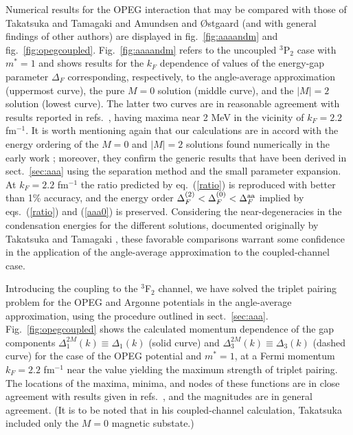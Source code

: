 Numerical results for the OPEG interaction that may be compared with 
those of Takatsuka and Tamagaki and Amundsen and {\O}stgaard (and with 
general findings of other authors) are displayed in fig.~\ref{fig:aaaandm}
and fig.~\ref{fig:opegcoupled}.  Fig.~\ref{fig:aaaandm} refers to 
the uncoupled $^3$P$_2$ case with $m^*=1$ and shows results for the 
$k_F$ dependence of values of the energy-gap parameter $\Delta_F$ 
corresponding, respectively, to the angle-average approximation (uppermost 
curve), the pure $M=0$ solution (middle curve), and the $|M|=2$ solution 
(lowest curve).  The latter two curves are in reasonable agreement with 
results reported in refs.~\cite{ttr,tt71,ostgaard}, having maxima near 
2 MeV in the vicinity of $k_F = 2.2$ fm$^{-1}$.  It is worth mentioning 
again that our calculations are in accord with the energy ordering of the 
$M=0$ and $|M|=2$ solutions found numerically in the early work 
\cite{tt71,ttr,ostgaard}; moreover, they confirm 
the generic results that have been derived in sect.~\ref{sec:aaa} 
using the separation method and the small parameter expansion.  At 
$k_F=2.2$ fm$^{-1}$ the ratio predicted by eq.~(\ref{ratio}) is 
reproduced with better than 1\% accuracy, and the energy order 
$\Delta_F^{(2)} < \Delta_F^{(0)} < \Delta_F^{\rm aa}$ implied by 
eqs.~(\ref{ratio}) and (\ref{aaa0}) is preserved.  Considering the 
near-degeneracies in the condensation energies for the different 
solutions, documented originally by Takatsuka and Tamagaki \cite{tt71}, 
these favorable comparisons warrant some confidence in the application 
of the angle-average approximation to the coupled-channel case.

Introducing the coupling to the $^3$F$_2$ channel, we have solved the
triplet pairing problem for the OPEG and Argonne potentials in the 
angle-average approximation, using the procedure outlined in 
sect.~\ref{sec:aaa}.  Fig.~\ref{fig:opegcoupled} shows the 
calculated momentum dependence of the gap components 
$\Delta_1^{2M}(k)\equiv\Delta_1(k)$ (solid curve) and 
$\Delta_3^{2M}(k)\equiv\Delta_3(k)$ (dashed curve) for the case
of the OPEG potential and $m^*=1$, at a Fermi momentum $k_F=2.2$ fm$^{-1}$
near the value yielding the maximum strength of triplet pairing.  The 
locations of the maxima, minima, and nodes of these functions are in close 
agreement with results given in refs.~\cite{t72,ttr}, and the magnitudes 
are in general agreement.  (It is to be noted that in his coupled-channel 
calculation, Takatsuka included only the $M=0$ magnetic substate.)

